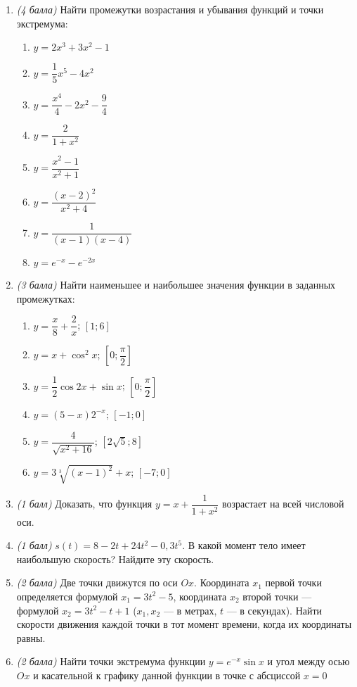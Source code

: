 \documentclass[12pt, a4paper]{article}
\begin{document}
\begin{enumerate}
	\item \textit{(4 балла)} Найти промежутки возрастания и убывания функций и точки экстремума:
	\begin{multicols}{3}
		\begin{enumerate}[label=\asbuk*)]
			\item $y=2x^3+3x^2-1$
			\item $y=\dfrac{1}{5}x^5-4x^2$
			\item $y=\dfrac{x^4}{4}-2x^2-\dfrac{9}{4}$
			\item $y=\dfrac{2}{1+x^2}$
			\item $y=\dfrac{x^2-1}{x^2+1}$
			\item $y=\dfrac{(x-2)^2}{x^2+4}$
			\item $y=\dfrac{1}{(x-1)(x-4)}$
			\item $y=e^{-x}-e^{-2x}$
		\end{enumerate}
	\end{multicols}
	\item \textit{(3 балла)} Найти наименьшее и наибольшее значения функции в заданных промежутках:
	\begin{multicols}{2}
		\begin{enumerate}[label=\asbuk*)]
			\item $y=\dfrac{x}{8}+\dfrac{2}{x}$; $[1;6]$
			\item $y=x+\cos^2x$; $\left[0;\dfrac{\pi}{2}\right]$
			\item $y=\dfrac{1}{2}\cos2x+\sin x$; $\left[0;\dfrac{\pi}{2}\right]$
			\item $y=(5-x)2^{-x}$; $[-1;0]$
			\item $y=\dfrac{4}{\sqrt{x^2+16}}$; $[2\sqrt{5};8]$
			\item $y=3\sqrt[3]{(x-1)^2}+x$; $[-7;0]$
		\end{enumerate}
	\end{multicols}
	\item \textit{(1 балл)} Доказать, что функция $y=x+\dfrac{1}{1+x^2}$ возрастает на всей числовой оси. 
	\item \textit{(1 балл)} $s(t)=8-2t+24t^2-0,3t^5$. В какой момент тело имеет наибольшую скорость? Найдите эту скорость.
	\item \textit{(2 балла)} Две точки движутся по оси $Ox$. Координата $x_1$ первой точки определяется формулой $x_1=3t^2-5$, координата $x_2$ второй точки — формулой $x_2=3t^2-t+1$ ($x_1,x_2$ — в метрах, $t$ — в секундах). Найти скорости движения каждой точки в тот момент времени, когда их координаты равны.
	\item \textit{(2 балла)} Найти точки экстремума функции $y=e^{-x}\sin x$ и угол между осью $Ox$ и касательной к графику данной функции в точке с абсциссой $x=0$
\end{enumerate}
\end{document}
